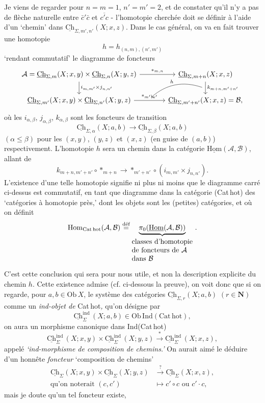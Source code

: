 \documentclass[11pt]{article}
\newcommand{\printedpage}[1]{\marginpar{\footnotesize p.~#1}}
\newcommand{\msp}[1]{\marginpar{\footnotesize [#1]}}
\newcommand{\uCh}{\underline{\mathrm{Ch}}}
\newcommand{\uHom}{\underline{\mathrm{Hom}}}
\newcommand{\Hom}{\mathrm{Hom}}
\begin{document}
Je viens de regarder pour $n=m=1$, $n'=m'=2$, et de constater qu'il n'y a pas de flèche naturelle entre $\bar{c}'\bar{c}$ et $\overline{c'c}$ - l'homotopie cherchée doit
\printedpage{8}
\msp{page 11}
se définir à l'aide d'un `chemin' dans $\uCh_{\Sigma,m',n'}(X;x,z)$. Dans le cas général, on va en fait trouver une homotopie
\[
h=h_{(n,m),(n',m')}
\]
`rendant commutatif' le diagramme de foncteurs
\[
\begin{tikzcd}[column sep=large]
\mathcal{A}=\uCh_{\Sigma,m}(X;x,y)\times\uCh_{\Sigma,n}(X;y,z) \arrow[r, "*_{m,n}"] \arrow[d, "i_{m,m'}\times j_{n,n'}"] & \uCh_{\Sigma,m+n}(X;x,z) \arrow[d, "k_{m+n,m'+n'}", ""'{name=K}] \\
\uCh_{\Sigma,m'}(X;x,y)\times\uCh_{\Sigma,n'}(X;y,z) \arrow[r, "*_{m',n'}", ""{name=S}] & \uCh_{\Sigma,m'+n'}(X;x,z)=\mathcal{B},
\arrow[from=K, to=S, bend right, "h"']
\end{tikzcd}
\]
où les $i_{\alpha,\beta}$, $j_{\alpha,\beta}$, $k_{\alpha,\beta}$ sont les foncteurs de transition
\[
\uCh_{\Sigma,\alpha}(X;a,b)\longrightarrow\uCh_{\Sigma,\beta}(X;a,b)
\]
$(\alpha\leq\beta)$ pour les $(x,y)$, $(y,z)$ et $(x,z)$ (en guise de $(a,b)$) respectivement. L'homotopie $h$ sera un chemin dans la catégorie $\uHom(\mathcal{A},\mathcal{B})$, allant de
\[
k_{m+n,m'+n'}\circ{*}_{m+n}\longrightarrow{*}_{m'+n'}\circ(i_{m,m'}\times j_{n,n'}).
\]
L'existence d'une telle homotopie signifie ni plus ni moins que le diagramme carré ci-dessus est commutatif, en tant que diagramme dans la catégorie (Cat\,hot) des `catégories à homotopie près,' dont les objets sont
\msp{page 12}
les (petites) catégories, et où on définit
\[
\Hom_{\mathrm{Cat\,hot}}(\mathcal{A},\mathcal{B})\overset{\text{déf}}{=}\underbrace{\pi_0(\uHom(\mathcal{A},\mathcal{B}))}_{\begin{array}{@{}l@{}}\text{classes d'homotopie}\\ \text{de foncteurs de }\mathcal{A}\\ \text{dans }\mathcal{B}\end{array}}\,.
\]
C'est cette conclusion qui sera pour nous utile, et non la description explicite du chemin $h$. Cette existence admise (cf. ci-dessous la preuve), on voit donc que si on regarde, pour $a,b\in\mathrm{Ob}\,X$, le système des catégories $\uCh_{\Sigma,r}(X;a,b)$ $(r\in\mathbf{N})$ comme un \textit{ind-objet de} Cat\,hot\textit{,} qu'on désigne par
\[
\uCh^{\mathrm{ind}}_{\Sigma}\,(X;a,b)\in\mathrm{Ob}\,\mathrm{Ind}(\mathrm{Cat\,hot}),
\]
on aura un morphisme canonique dans Ind(Cat\,hot)
\[
\uCh^{\mathrm{ind}}_{\Sigma}\,(X;x,y)\times\uCh^{\mathrm{ind}}_{\Sigma}\,(X;y,z)\xrightarrow{\ *\ }\uCh^{\mathrm{ind}}_{\Sigma}\,(X;x,z),
\]
appelé \textit{`ind-morphisme de composition de chemins.'} On aurait aimé le déduire d'un honnête \textit{foncteur} `composition de chemins'
\[
\begin{aligned}
\uCh_\Sigma(X;x,y)\times\uCh_\Sigma(X;y,z) &\xrightarrow{\ ?\ } \uCh_\Sigma(X;x,z),\\
\text{qu'on noterait }(c,c') &\longmapsto c'\circ c\text{ ou }c'\cdot c,
\end{aligned}
\]
mais je doute qu'un tel foncteur existe,
\end{document}
